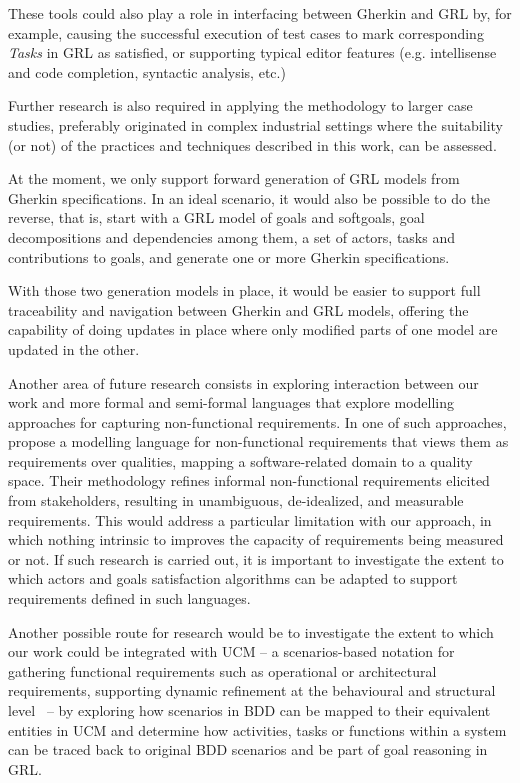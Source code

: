 \documentclass[dissertation,final]{softeng}
\newcommand{\nfrs}{non-functional requirements\xspace}
\begin{document}
These tools could also play a role in interfacing between Gherkin and GRL by, for example, causing the successful execution of test cases to mark corresponding \emph{Tasks} in GRL as satisfied, or supporting typical editor features (e.g. intellisense and code completion, syntactic analysis, etc.)

Further research is also required in applying the methodology to larger case studies, preferably originated in complex industrial settings where the suitability (or not) of the practices and techniques described in this work, can be assessed.

At the moment, we only support forward generation of GRL models from Gherkin specifications. In an ideal scenario, it would also be possible to do the reverse, that is, start with a GRL model of goals and softgoals, goal decompositions and dependencies among them, a set of actors, tasks and contributions to goals, and generate one or more Gherkin specifications.

With those two generation models in place, it would be easier to support full traceability and navigation between Gherkin and GRL models, offering the capability of doing updates in place where only modified parts of one model are updated in the other.

Another area of future research consists in exploring interaction between our work and more formal and semi-formal languages that explore modelling approaches for capturing \nfrs. In one of such approaches, \citet{MylopoulosOnt2014} propose a modelling language for non-functional requirements that views them as requirements over qualities, mapping a software-related domain to a quality space. Their methodology refines informal \nfrs elicited from stakeholders, resulting in unambiguous, de-idealized, and measurable requirements. This would address a particular limitation with our approach, in which nothing intrinsic to improves the capacity of requirements being measured or not. If such research is carried out, it is important to investigate the extent to which actors and goals satisfaction algorithms can be adapted to support requirements defined in such languages.

Another possible route for research would be to investigate the extent to which our work could be integrated with UCM -- a scenarios-based notation for gathering functional requirements such as operational or architectural requirements, supporting dynamic refinement at the behavioural and structural level~\citep{Roy:2007wyba} -- by exploring how scenarios in BDD can be mapped to their equivalent entities in UCM and determine how activities, tasks or functions within a system can be traced back to original BDD scenarios and be part of goal reasoning in GRL.
\end{document}

